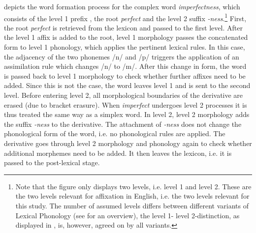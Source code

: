  depicts the word formation process for the complex word \textit{imperfectness}, which consists of the level 1 prefix , the root \textit{perfect} and the level 2 suffix \textit{-ness}.\footnote{Note that the figure only displays two levels, i.e. level 1 and level 2. These are the two levels relevant for affixation in English, i.e. the two levels relevant for this study. The number of assumed levels differs between different variants of Lexical Phonology (see \citealt{Giegerich.1999} for an overview), the level 1- level 2-distinction, as displayed in , is, however, agreed on by all variants.}
First, the root \textit{perfect} is retrieved from the lexicon and passed to the first level. After the level 1 affix  is added to the root, level 1 morphology passes the concatenated form to level 1 phonology, which applies the pertinent lexical rules. In this case, the adjacency of the two phonemes /n/ and /p/ triggers the application of an assimilation rule which changes /n/ to /m/. After this change in form, the word is passed back to level 1 morphology to check whether further affixes need to be added. Since this is not the case, the word leaves level 1 and is sent to the second level. 
Before entering level 2, all morphological boundaries of the derivative are erased (due to bracket erasure). When \textit{imperfect} undergoes level 2 processes it is thus treated the same way as a simplex word.  
In level 2, level 2 morphology adds the suffix \textit{-ness} to the derivative. The attachment of \textit{-ness} does not change the phonological form of the word, i.e. no phonological rules are applied. The derivative goes through level 2 morphology and phonology again to check whether additional morphemes need to be added. It then leaves the lexicon, i.e. it is passed to the post-lexical stage.\\

